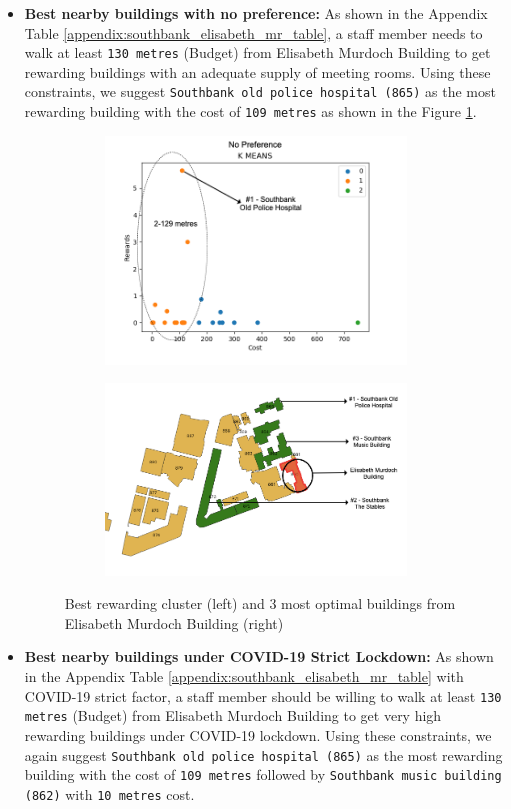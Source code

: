 \begin{itemize}
    \item \textbf{Best nearby buildings with no preference:} As shown in the Appendix Table \ref{appendix:southbank_elisabeth_mr_table}, a staff member needs to walk at least \texttt{130 metres} (Budget) from Elisabeth Murdoch Building to get rewarding buildings with an adequate supply of meeting rooms. Using these constraints, we suggest \texttt{Southbank old police hospital (865)} as the most rewarding building with the cost of \texttt{109 metres} as shown in the Figure \ref{fig:southbank-mr-no-factors}.
    
    \begin{figure}[H]
\begin{subfigure}{.5\textwidth}
\centering
  \includegraphics[width=8cm]{resources/images/spatial-mr/southbank-mr/elisabeth_02.png}
\end{subfigure}%
\begin{subfigure}{.5\textwidth}
  \centering
  \includegraphics[width=8cm]{resources/images/spatial-mr/southbank-mr/elisabeth_03.png}
\end{subfigure}
\caption{Best rewarding cluster (left) and 3 most optimal buildings from Elisabeth Murdoch Building (right)}
\label{fig:southbank-mr-no-factors}
\end{figure}

\item \textbf{Best nearby buildings under COVID-19 Strict Lockdown:} As shown in the Appendix Table \ref{appendix:southbank_elisabeth_mr_table} with COVID-19 strict factor, a staff member should be willing to walk at least \texttt{130 metres} (Budget) from Elisabeth Murdoch Building to get very high rewarding buildings under COVID-19 lockdown. Using these constraints, we again suggest \texttt{Southbank old police hospital (865)} as the most rewarding building with the cost of \texttt{109 metres} followed by \texttt{Southbank music building (862)} with \texttt{10 metres} cost.


\end{itemize}
